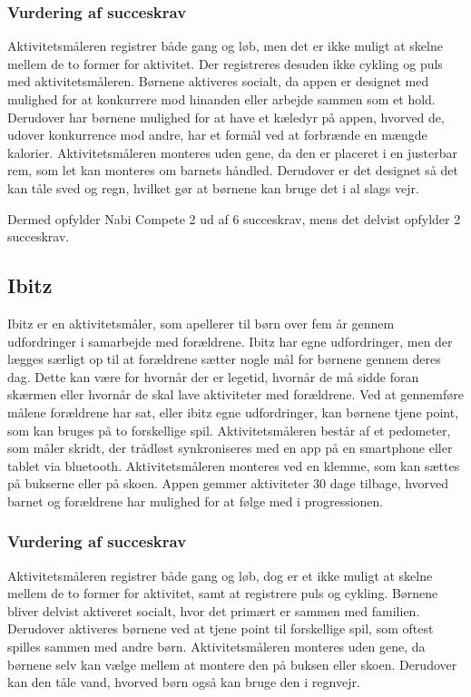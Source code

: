 \subsubsection{Vurdering af succeskrav}
Aktivitetsmåleren registrer både gang og løb, men det er ikke muligt at skelne mellem de to former for aktivitet. Der registreres desuden ikke cykling og puls med aktivitetsmåleren. 
Børnene aktiveres socialt, da appen er designet med mulighed for at konkurrere mod hinanden eller arbejde sammen som et hold. Derudover har børnene mulighed for at have et kæledyr på appen, hvorved de, udover konkurrence mod andre, har et formål ved at forbrænde en mængde kalorier. Aktivitetsmåleren monteres uden gene, da den er placeret i en justerbar rem, som let kan monteres om barnets håndled. Derudover er det designet så det kan tåle sved og regn, hvilket gør at børnene kan bruge det i al slags vejr. 

Dermed opfylder Nabi Compete 2 ud af 6 succeskrav, mens det delvist opfylder 2 succeskrav.

\subsection{Ibitz}
Ibitz er en aktivitetsmåler, som apellerer til børn over fem år gennem udfordringer i samarbejde med forældrene. Ibitz har egne udfordringer, men der lægges særligt op til at forældrene sætter nogle mål for børnene gennem deres dag. Dette kan være for hvornår der er legetid, hvornår de må sidde foran skærmen eller hvornår de skal lave aktiviteter med forældrene. Ved at gennemføre målene forældrene har sat, eller ibitz egne udfordringer, kan børnene tjene point, som kan bruges på to forskellige spil. Aktivitetsmåleren består af et pedometer, som måler skridt, der trådløst synkroniseres med en app på en smartphone eller tablet via bluetooth. Aktivitetsmåleren monteres ved en klemme, som kan sættes på bukserne eller på skoen. Appen gemmer aktiviteter 30 dage tilbage, hvorved barnet og forældrene har mulighed for at følge med i progressionen. 

\subsubsection{Vurdering af succeskrav}
Aktivitetsmåleren registrer både gang og løb, dog er et ikke muligt at skelne mellem de to former for aktivitet, samt at registrere puls og cykling. Børnene bliver delvist aktiveret socialt, hvor det primært er sammen med familien. Derudover aktiveres børnene ved at tjene point til forskellige spil, som oftest spilles sammen med andre børn. Aktivitetsmåleren monteres uden gene, da børnene selv kan vælge mellem at montere den på buksen eller skoen. Derudover kan den tåle vand, hvorved børn også kan bruge den i regnvejr.  

